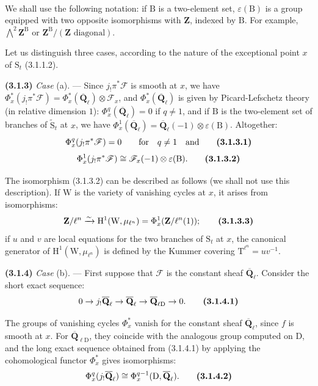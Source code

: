 \documentclass[11pt,leqno]{article}
\newcommand{\Page}[1]{\ifvmode\noindent\else\unskip\ \fi{\footnotesize\textcolor{gray}{[p.\,#1]}}\ \ignorespaces}
\begin{document}
\Page{199}

We shall use the following notation: if \(\mathrm B\) is a two-element set, \(\varepsilon(\mathrm B)\) is a group equipped with two opposite isomorphisms with \(\mathbf Z\), indexed by \(\mathrm B\). For example, \(\bigwedge\limits^{2}\mathbf Z^{\mathrm B}\) or \(\mathbf Z^{\mathrm B}/(\mathbf Z\text{ diagonal})\).

Let us distinguish three cases, according to the nature of the exceptional point \(x\) of \(\mathrm S_t\) (3.1.1.2).

\textbf{(3.1.3)} \textit{Case} (a). — Since \(j_!\pi^*\mathscr F\) is smooth at \(x\), we have \(\Phi_x^*(j_!\pi^*\mathscr F)=\Phi_x^*(\overline{\mathbf Q}_\ell)\otimes\mathscr F_x\), and \(\Phi_x^*(\overline{\mathbf Q}_\ell)\) is given by Picard-Lefschetz theory (in relative dimension \(1\)): \(\Phi_x^q(\overline{\mathbf Q}_\ell)=0\) if \(q\ne1\), and if \(\mathrm B\) is the two-element set of branches of \(\widetilde{\mathrm S}_t\) at \(x\), we have \(\Phi_x^1(\overline{\mathbf Q}_\ell)=\overline{\mathbf Q}_\ell(-1)\otimes\varepsilon(\mathrm B)\). Altogether:
\[
\Phi_x^q(j_!\pi^*\mathscr F)=0
\qquad\text{for}\quad q\ne1
\quad\text{and}
\tag*{\textbf{(3.1.3.1)}}
\]
\[
\Phi_x^1(j_!\pi^*\mathscr F)
\cong\mathscr F_x(-1)\otimes\varepsilon(\mathrm B).
\tag*{\textbf{(3.1.3.2)}}
\]

The isomorphism (3.1.3.2) can be described as follows (we shall not use this description). If \(\mathrm W\) is the variety of vanishing cycles at \(x\), it arises from isomorphisms:
\[
\mathbf Z/\ell^n
\xrightarrow{\sim}
\mathrm H^1(\mathrm W,\mu_{\ell^n})
=\Phi_x^1(\mathbf Z/\ell^n(1));
\tag*{\textbf{(3.1.3.3)}}
\]
if \(u\) and \(v\) are local equations for the two branches of \(\mathrm S_t\) at \(x\), the canonical generator of \(\mathrm H^1(\mathrm W,\mu_{\ell^n})\) is defined by the Kummer covering \(\mathrm T^{\ell^n}=uv^{-1}\).

\textbf{(3.1.4)} \textit{Case} (b). — First suppose that \(\mathscr F\) is the constant sheaf \(\overline{\mathbf Q}_\ell\). Consider the short exact sequence:
\[
0\to j_!\overline{\mathbf Q}_\ell
\to\overline{\mathbf Q}_\ell
\to\overline{\mathbf Q}_{\ell\mathrm D}\to0.
\tag*{\textbf{(3.1.4.1)}}
\]

The groups of vanishing cycles \(\Phi_x^*\) vanish for the constant sheaf \(\overline{\mathbf Q}_\ell\), since \(f\) is smooth at \(x\). For \(\overline{\mathbf Q}_{\ell\mathrm D}\), they coincide with the analogous group computed on \(\mathrm D\), and the long exact sequence obtained from (3.1.4.1) by applying the cohomological functor \(\Phi_x^*\) gives isomorphisms:
\[
\Phi_x^q(j_!\overline{\mathbf Q}_\ell)
\cong\Phi_x^{q-1}(\mathrm D,\overline{\mathbf Q}_\ell).
\tag*{\textbf{(3.1.4.2)}}
\]
\end{document}
